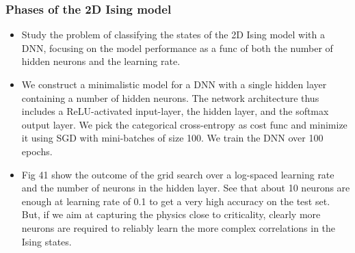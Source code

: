 \documentclass[norsk,a4paper,11pt]{article}
\begin{document}
\subsubsection{Phases of the 2D Ising model}
\begin{itemize}
	\item Study the problem of classifying the states of the 2D Ising model with a DNN, focusing on the model performance as a func of both the number of hidden neurons and the learning rate.
	\item We construct a minimalistic model for a DNN with a single hidden layer containing a number of hidden neurons. The network architecture thus includes a ReLU-activated input-layer, the hidden layer, and the softmax output layer. We pick the categorical cross-entropy as cost func and minimize it using SGD with mini-batches of size 100. We train the DNN over 100 epochs.
	\item Fig 41 show the outcome of the grid search over a log-spaced learning rate and the number of neurons in the hidden layer. See that about 10 neurons are enough at learning rate of 0.1 to get a very high accuracy on the test set. But, if we aim at capturing the physics close to criticality, clearly more neurons are required to reliably learn the more complex correlations in the Ising states.
\end{itemize}
\end{document}
